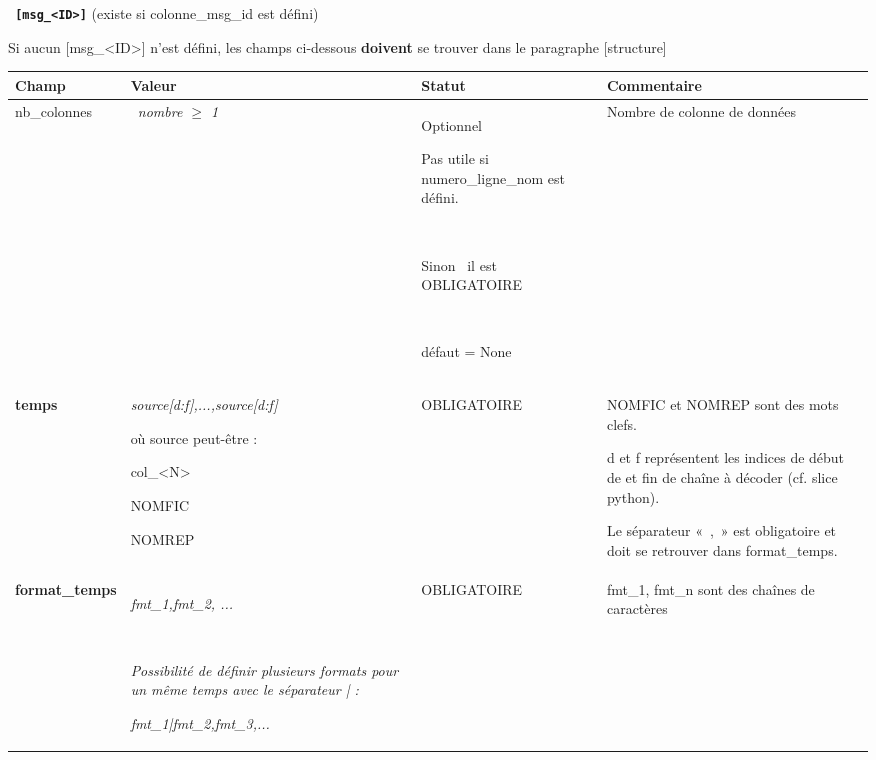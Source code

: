 \medskip
{\texttt{\textbf{\large \color{blue} {[msg\_{\textless}ID{\textgreater}]}}} (existe si colonne\_msg\_id est défini)

\medskip
Si aucun [msg\_{\textless}ID{\textgreater}] n'est défini, les champs ci-dessous \textbf{doivent} se trouver dans le
paragraphe [structure]

\medskip
\begin{center}
\tablefirsthead{}
\tabletail{\hline}
\tablelasttail{}
\begin{supertabular}{|p{3.504cm}|p{3.7cm}|p{3.642cm}|p{4.448cm}|}
\hline
Champ &
Valeur &
Statut &
Commentaire\\\hline
nb\_colonnes &
{\itshape \ nombre ${\geq}$ 1} &
Optionnel 

{\color{black} Pas utile si numero\_ligne\_nom est défini.}

~

{\color{black} Sinon \ il est OBLIGATOIRE}

~

{\color{black} défaut = None} &
Nombre de colonne de données \\\hline
{\bfseries\color{black} \textmd{temps} }

~

~
 &
{\itshape\color{black} source[d:f],...,source[d:f]

où source peut-être :

col\_{\textless}N{\textgreater}

NOMFIC

NOMREP} &
{\color{black} OBLIGATOIRE}

~
 &
{\color{black} NOMFIC et NOMREP sont des mots clefs.}

{\color{black} d et f représentent les indices de début de et fin de chaîne à décoder (cf. slice python).}

{\color{black} Le séparateur «~,~» est obligatoire et doit se retrouver dans format\_temps. }\\\hline
{\bfseries\color{black} \textmd{format\_temps} } &
{\itshape\color{black} fmt\_1,fmt\_2, ...}

~

{\itshape\color{black} Possibilité de définir plusieurs formats pour un même temps avec le séparateur | :}


{\itshape\color{black} fmt\_1|fmt\_2,fmt\_3,...}  &
{\color{black} OBLIGATOIRE} &
{\color{black} fmt\_1, fmt\_n sont des chaînes de caractères }


\end{supertabular}
\end{center}}
